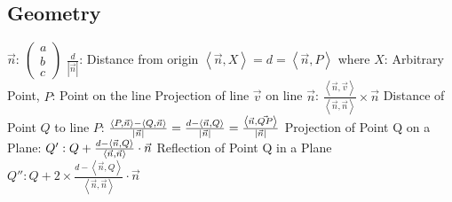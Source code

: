 \documentclass[12pt]{article}
\begin{document}
\subsection{Geometry}
\begin{math}
\vec{n}:\ \left ( \begin{matrix} a\\ b\\ c\end{matrix} \right )
\end{math}\newline\newline\newline
\begin{math}\frac{d}{\left |\vec{n}  \right |}\end{math}: Distance from origin\newline\newline
\begin{math}\left \langle \vec{n},X \right \rangle = d = \left \langle \vec{n},P \right \rangle\end{math} where $X$: Arbitrary Point, $P$: Point on the line\newline\newline
Projection of line $\vec{v}$ on line $\vec{n}$: \begin{math}\frac{\left \langle \vec{n}, \vec{v} \right \rangle}{\left \langle \vec{n},\vec{n} \right \rangle}\times \vec{n}\end{math}\newline\newline
Distance of Point $Q$ to line $P$:\newline
\begin{math}
\frac{\left \langle P,\vec{n} \right \rangle - \left \langle Q,\vec{n} \right \rangle}{\left | \vec{n} \right |}=\frac{d-\left \langle \vec{n}, Q \right \rangle}{\left | \vec{n} \right |}=
\frac{\left \langle \vec{n}, \vec{QP} \right \rangle}{\left | \vec{n} \right |}\newline\newline
\end{math}
Projection of Point Q on a Plane:\newline\newline
\begin{math}
Q':Q+\frac{d-\left \langle \vec{n},Q \right \rangle}{\left \langle \vec{n},\vec{n} \right \rangle}\cdot \vec{n}\newline\newline
\end{math}\newline\newline
Reflection of Point Q in a Plane\newline\newline
\begin{math}
Q'': Q+2\times\frac{d-\left \langle \vec{n},Q \right \rangle}{\left \langle \vec{n},\vec{n} \right \rangle}\cdot \vec{n}
\end{math}\newpage
\end{document}
